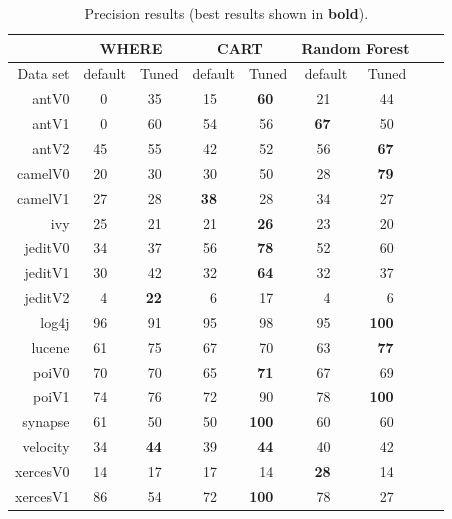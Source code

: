 \documentclass[final,twocolumn,5p]{elsarticle}
\begin{document}
\begin{table}[!t]
\renewcommand{\baselinestretch}{0.8} 
\scriptsize    

\begin{tabular}{r|rl|rl|rl|rl|rl|rlrl}
      &   \multicolumn{4}{c|}{WHERE}         &   \multicolumn{4}{c|}{CART}         &   \multicolumn{4}{c}{Random Forest}         \\\hline
  Data set   &   \multicolumn{2}{c}{default}         &   \multicolumn{2}{c|}{Tuned}         &   \multicolumn{2}{c}{default}         &   \multicolumn{2}{c|}{Tuned}    &   \multicolumn{2}{c}{default}  &   \multicolumn{2}{c}{Tuned}\\\hline
antV0 & 0 &   & 35 &   & 15 &   & {\bf 60} &   & 21 &   & 44 &  \\
antV1 & 0 &   & 60 &   & 54 &   & 56 &   & {\bf 67} &   & 50 &  \\
antV2 & 45 &   & 55 &   & 42 &   & 52 &   & 56 &   & {\bf 67} &  \\
camelV0 & 20 &   & 30 &   & 30 &   & 50 &   & 28 &   & {\bf 79} &  \\
camelV1 & 27 &   & 28 &   & {\bf 38} &   & 28 &   & 34 &   & 27 &  \\
ivy & 25 &   & 21 &   & 21 &   & {\bf 26} &   & 23 &   & 20 &  \\
jeditV0 & 34 &   & 37 &   & 56 &   & {\bf 78} &   & 52 &   & 60 &  \\
jeditV1 & 30 &   & 42 &   & 32 &   & {\bf 64} &   & 32 &   & 37 &  \\
jeditV2 & 4 &   & {\bf 22} &   & 6 &   & 17 &   & 4 &   & 6 &  \\
log4j & 96 &   & 91 &   & 95 &   & 98 &   & 95 &   & {\bf 100} &  \\
lucene & 61 &   & 75 &   & 67 &   & 70 &   & 63 &   & {\bf 77} &  \\
poiV0 & 70 &   & 70 &   & 65 &   & {\bf 71} &   &  67 &   & 69 &  \\
poiV1 & 74 &   & 76 &   & 72 &   & 90 &   & 78 &   & {\bf 100} &  \\
synapse & 61 &   & 50 &   & 50 &   & {\bf 100} &   & 60 &   & 60 &  \\
velocity & 34 &   & {\bf 44} &   & 39 &   & {\bf 44} &   & 40 &   & 42 &  \\
xercesV0 & 14 &   & 17 &   & 17 &   & 14 &   & {\bf 28} &   & 14 &  \\
xercesV1 & 86 &   & 54 &   & 72 &   & {\bf 100} &   & 78 &   & 27 &  \\
\end{tabular}
\caption{Precision results (best results  shown in {\bf bold}).}
\label{tab:precisionbars}
\end{table}
 
\end{document}
